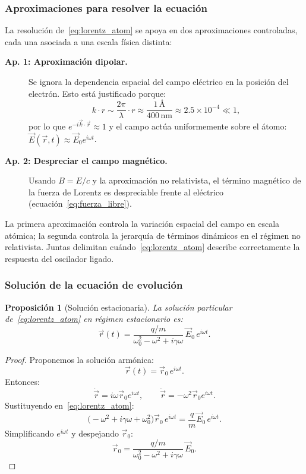 \documentclass[12pt, a4paper]{article}
\theoremstyle{plain}
\newtheorem{proposicion}[teorema]{Proposición}
\theoremstyle{definition}
\theoremstyle{remark}
\newcommand{\ve}[1]{\vec{#1}}
\begin{document}
\subsubsection{Aproximaciones para resolver la ecuación}

La resolución de~\eqref{eq:lorentz_atom} se apoya en dos aproximaciones
controladas, cada una asociada a una escala física distinta:

\begin{description}
  \item[\textbf{Ap. 1: Aproximación dipolar.}]
        Se ignora la dependencia espacial del campo eléctrico en la posición
        del electrón. Esto está justificado porque:
        \[
          k\cdot r \sim \frac{2\pi}{\lambda}\cdot r
          \approx \frac{1\,\text{\AA}}{400\,\text{nm}} \approx 2.5\times10^{-4} \ll 1,
        \]
        por lo que $e^{-i\ve{k}\cdot\ve{r}}\approx 1$ y el campo actúa
        uniformemente sobre el átomo: $\ve{E}(\ve{r},t)\approx\ve{E}_0 e^{i\omega t}$.

  \item[\textbf{Ap. 2: Despreciar el campo magnético.}]
        Usando $B=E/c$ y la aproximación no relativista, el término magnético
        de la fuerza de Lorentz es despreciable frente al eléctrico
        (ecuación~\eqref{eq:fuerza_libre}).
\end{description}

La primera aproximación controla la variación espacial del campo en escala
atómica; la segunda controla la jerarquía de términos dinámicos en el régimen
no relativista. Juntas delimitan cuándo~\eqref{eq:lorentz_atom} describe
correctamente la respuesta del oscilador ligado.

\subsubsection{Solución de la ecuación de evolución}

\begin{proposicion}[Solución estacionaria]
La solución particular de~\eqref{eq:lorentz_atom} en régimen estacionario es:
\begin{equation}
  \ve{r}(t) = \frac{q/m}{\omega_0^2 - \omega^2 + i\gamma\omega}
              \,\ve{E}_0\,e^{i\omega t}. \label{eq:sol_lorentz}
\end{equation}
\end{proposicion}

\begin{proof}
Proponemos la solución armónica:
\[
  \ve{r}(t) = \ve{r}_0\,e^{i\omega t}.
\]
Entonces:
\[
  \dot{\ve{r}}=i\omega\ve{r}_0e^{i\omega t},
  \qquad
  \ddot{\ve{r}}=-\omega^2\ve{r}_0e^{i\omega t}.
\]
Sustituyendo en~\eqref{eq:lorentz_atom}:
\[
  \bigl(-\omega^2 + i\gamma\omega + \omega_0^2\bigr)\ve{r}_0\,e^{i\omega t}
  = \frac{q}{m}\ve{E}_0\,e^{i\omega t}.
\]
Simplificando $e^{i\omega t}$ y despejando $\ve{r}_0$:
\[
  \ve{r}_0 = \frac{q/m}{\omega_0^2 - \omega^2 + i\gamma\omega}\,\ve{E}_0.
\]
\end{proof}
\end{document}
